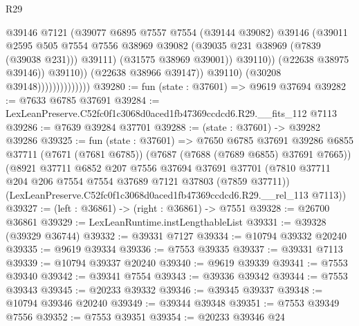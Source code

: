 \begin{lexlean}{R29}
\begin{coremodule}
                                            @39146
                                            @7121
                                            (@39077
                                              @6895
                                              @7557
                                              @7554
                                              (@39144 @39082)
                                              @39146
                                              (@39011
                                                @2595
                                                @505
                                                @7554
                                                @7556
                                                @38969
                                                @39082
                                                (@39035 @231 @38969 (@7839 (@39038 @231)))
                                                @39111)
                                              (@31575 @38969 @39001))
                                            @39110))
                                        (@22638 @38975 @39146))
                                      @39110))
                                  (@22638 @38966 @39147))
                                @39110)
                              (@30208 @39148))))))))))))))
@39280 := fun (state : @37601) => @9619 @37694
@39282 := @7633 @6785 @37691
@39284 := LexLeanPreserve.C52fc0f1c3068d0aced1fb47369ccdcd6.R29.__fits_112 @7113
@39286 := @7639 @39284 @37701
@39288 := (state : @37601) -> @39282 @39286
@39325 := fun (state : @37601) =>
  @7650
    @6785
    @37691
    @39286
    @6855
    @37711
    (@7671 (@7681 @6785))
    (@7687 (@7688 (@7689 @6855) @37691 @7665))
    (@8921
      @37711
      @6852
      @207
      @7556
      @37694
      @37691
      @37701
      (@7810 @37711 @204 @206 @7554 @7554 @37689 @7121 @37803 (@7859 @37711))
      (LexLeanPreserve.C52fc0f1c3068d0aced1fb47369ccdcd6.R29.__rel_113 @7113))
@39327 := (left : @36861) -> (right : @36861) -> @7551
@39328 := @26700 @36861
@39329 := LexLeanRuntime.instLengthableList
@39331 := @39328 (@39329 @36744)
@39332 := @39331 @7127
@39334 := @10794 @39332 @20240
@39335 := @9619 @39334
@39336 := @7553 @39335
@39337 := @39331 @7113
@39339 := @10794 @39337 @20240
@39340 := @9619 @39339
@39341 := @7553 @39340
@39342 := @39341 @7554
@39343 := @39336 @39342
@39344 := @7553 @39343
@39345 := @20233 @39332
@39346 := @39345 @39337
@39348 := @10794 @39346 @20240
@39349 := @39344 @39348
@39351 := @7553 @39349 @7556
@39352 := @7553 @39351
@39354 := @20233 @39346 @24

\end{coremodule}
\end{lexlean}
